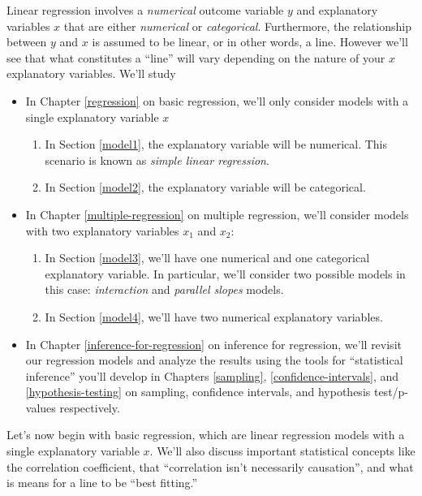 \documentclass[12pt, krantz2,]{krantz}
\providecommand{\tightlist}{%
  \setlength{\itemsep}{0pt}\setlength{\parskip}{0pt}}
\begin{document}
Linear regression involves a \emph{numerical} outcome variable \(y\) and explanatory variables \(x\) that are either \emph{numerical} or \emph{categorical}. Furthermore, the relationship between \(y\) and \(x\) is assumed to be linear, or in other words, a line. However we'll see that what constitutes a ``line'' will vary depending on the nature of your \(x\) explanatory variables. We'll study

\begin{itemize}
\tightlist
\item
  In Chapter \ref{regression} on basic regression, we'll only consider models with a single explanatory variable \(x\)

  \begin{enumerate}
  \def\labelenumi{\arabic{enumi}.}
  \tightlist
  \item
    In Section \ref{model1}, the explanatory variable will be numerical. This scenario is known as \emph{simple linear regression}.
  \item
    In Section \ref{model2}, the explanatory variable will be categorical.
  \end{enumerate}
\item
  In Chapter \ref{multiple-regression} on multiple regression, we'll consider models with two explanatory variables \(x_1\) and \(x_2\):

  \begin{enumerate}
  \def\labelenumi{\arabic{enumi}.}
  \tightlist
  \item
    In Section \ref{model3}, we'll have one numerical and one categorical explanatory variable. In particular, we'll consider two possible models in this case: \emph{interaction} and \emph{parallel slopes} models.
  \item
    In Section \ref{model4}, we'll have two numerical explanatory variables.
  \end{enumerate}
\item
  In Chapter \ref{inference-for-regression} on inference for regression, we'll revisit our regression models and analyze the results using the tools for ``statistical inference'' you'll develop in Chapters \ref{sampling}, \ref{confidence-intervals}, and \ref{hypothesis-testing} on sampling, confidence intervals, and hypothesis test/p-values respectively.
\end{itemize}

Let's now begin with basic regression, which are linear regression models with a single explanatory variable \(x\). We'll also discuss important statistical concepts like the correlation coefficient, that ``correlation isn't necessarily causation'', and what is means for a line to be ``best fitting.''
\end{document}
